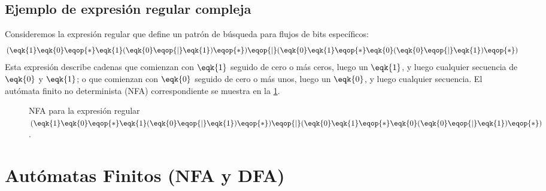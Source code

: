 \subsection{Ejemplo de expresión regular compleja}

Consideremos la expresión regular que define un patrón de búsqueda para flujos de bits específicos:
\[
(\eqk{1}\eqk{0}\eqop{*}\eqk{1}(\eqk{0} \eqop{\mid} \eqk{1})\eqop{*}) \eqop{\mid} (\eqk{0}\eqk{1}\eqop{*}\eqk{0}(\eqk{0} \eqop{\mid} \eqk{1})\eqop{*})
\]
Esta expresión describe cadenas que comienzan con $\eqk{1}$ seguido de cero o más ceros, luego un $\eqk{1}$, y luego cualquier secuencia de $\eqk{0}$ y $\eqk{1}$; o que comienzan con $\eqk{0}$ seguido de cero o más unos, luego un $\eqk{0}$, y luego cualquier secuencia. El autómata finito no determinista (NFA) correspondiente se muestra en la \cref{fig:complex-re-nfa}.

\begin{figure}[htbp]
  \centering
  \caption{NFA para la expresión regular $(\eqk{1}\eqk{0}\eqop{*}\eqk{1}(\eqk{0} \eqop{\mid} \eqk{1})\eqop{*}) \eqop{\mid} (\eqk{0}\eqk{1}\eqop{*}\eqk{0}(\eqk{0} \eqop{\mid} \eqk{1})\eqop{*})$.}
  \label{fig:complex-re-nfa}
\end{figure}

\section{Autómatas Finitos (NFA y DFA)}
\label{sec:2_3_automata_finito}

